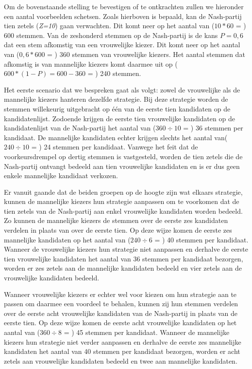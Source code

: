 Om de bovenstaande stelling te bevestigen of te ontkrachten zullen we hieronder een aantal voorbeelden schetsen. Zoals hierboven is bepaald, kan de Nash-partij tien zetels (\textit{Z=10}) gaan verwachten. Dit komt neer op het aantal van ($10*60$ = ) 600 stemmen. Van de zeshonderd stemmen op de Nash-partij is de kans $P=0,6$ dat een stem afkomstig van een vrouwelijke kiezer. Dit komt neer op het aantal van ($0,6*600$ = ) 360 stemmen van vrouwelijke kiezers. Het aantal stemmen dat afkomstig is van mannelijke kiezers komt daarmee uit op ($600*(1-P)=600-360$ = ) 240 stemmen.

Het eerste scenario dat we bespreken gaat als volgt: zowel de vrouwelijke als de mannelijke kiezers hanteren dezelfde strategie. Bij deze strategie worden de stemmen willekeurig uitgebracht op één van de eerste tien kandidaten op de kandidatenlijst. Zodoende krijgen de eerste tien vrouwelijke kandidaten op de kandidatenlijst van de Nash-partij het aantal van ($360\div10$ = ) 36 stemmen per kandidaat. De mannelijke kandidaten echter krijgen slechts het aantal van($240\div10$ = ) 24 stemmen per kandidaat. Vanwege het feit dat de voorkeursdrempel op dertig stemmen is vastgesteld, worden de tien zetels die de Nash-partij ontvangt bedeeld aan tien vrouwelijke kandidaten en is er dus geen enkele mannelijke kandidaat verkozen.

Er vanuit gaande dat de beiden groepen op de hoogte zijn wat elkaars strategie, kunnen de mannelijke kiezers hun strategie aanpassen om te voorkomen dat de tien zetels van de Nash-partij aan enkel vrouwelijke kandidaten worden bedeeld. Zo kunnen de mannelijke kiezers de stemmen over de eerste zes kandidaten verdelen in plaats van over de eerste tien. Op deze wijze komen de eerste zes mannelijke kandidaten op het aantal van ($240\div6$ = ) 40 stemmen per kandidaat. Wanneer de vrouwelijke kiezers hun strategie niet aanpassen en derhalve de eerste tien vrouwelijke kandidaten het aantal van 36 stemmen per kandidaat bezorgen, worden er zes zetels aan de mannelijke kandidaten bedeeld en vier zetels aan de vrouwelijke kandidaten bedeeld. 

Wanneer vrouwelijke kiezers er echter wel voor kiezen om hun strategie aan te passen om daarmee een voordeel te behalen, kunnen zij hun stemmen verdelen over de eerste acht vrouwelijke kandidaten van de Nash-partij in plaats van de eerste tien. Op deze wijze komen de eerste acht vrouwelijke kandidaten op het aantal van ($360\div8$ = ) 45 stemmen per kandidaat. Wanneer de mannelijke kiezers hun strategie niet verder aanpassen en derhalve de eerste zes mannelijke kandidaten het aantal van 40 stemmen per kandidaat bezorgen, worden er acht zetels aan vrouwelijke kandidaten bedeeld en twee aan mannelijke kandidaten. 

